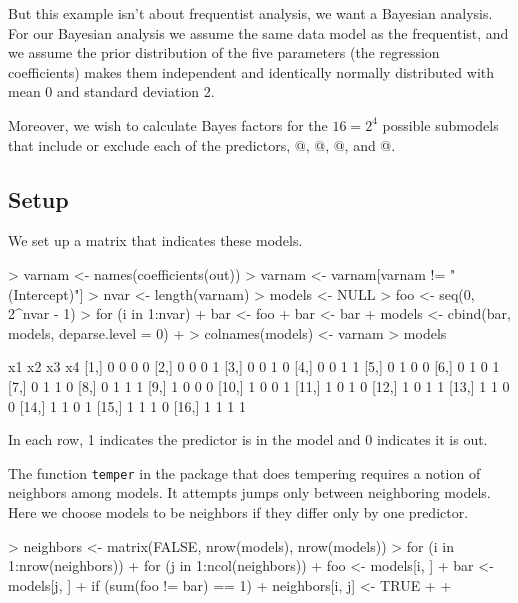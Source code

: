 \documentclass[11pt]{article}
\begin{document}
But this example isn't about frequentist analysis, we want a Bayesian
analysis.  For our Bayesian analysis we assume the same data model as the
frequentist, and we assume the prior distribution of the five parameters
(the regression coefficients) makes them independent and identically
normally distributed with mean 0 and standard deviation 2.

Moreover, we wish to calculate Bayes factors for the $16 = 2^4$ possible
submodels that include or exclude each of the
predictors, @, @, @, and @.

\subsection{Setup}

We set up a matrix that indicates these models.
\begin{Schunk}
\begin{Sinput}
> varnam <- names(coefficients(out))
> varnam <- varnam[varnam != "(Intercept)"]
> nvar <- length(varnam)
> models <- NULL
> foo <- seq(0, 2^nvar - 1)
> for (i in 1:nvar) {
+     bar <- foo%/%2^(i - 1)
+     bar <- bar%%2
+     models <- cbind(bar, models, deparse.level = 0)
+ }
> colnames(models) <- varnam
> models
\end{Sinput}
\begin{Soutput}
      x1 x2 x3 x4
 [1,]  0  0  0  0
 [2,]  0  0  0  1
 [3,]  0  0  1  0
 [4,]  0  0  1  1
 [5,]  0  1  0  0
 [6,]  0  1  0  1
 [7,]  0  1  1  0
 [8,]  0  1  1  1
 [9,]  1  0  0  0
[10,]  1  0  0  1
[11,]  1  0  1  0
[12,]  1  0  1  1
[13,]  1  1  0  0
[14,]  1  1  0  1
[15,]  1  1  1  0
[16,]  1  1  1  1
\end{Soutput}
\end{Schunk}
In each row, 1 indicates the predictor is in the model and 0 indicates it is
out.

The function \texttt{temper} in the  package that does tempering
requires a notion of neighbors among models.  It attempts jumps only between
neighboring models.  Here we choose models to be neighbors if they differ
only by one predictor.
\begin{Schunk}
\begin{Sinput}
> neighbors <- matrix(FALSE, nrow(models), nrow(models))
> for (i in 1:nrow(neighbors)) {
+     for (j in 1:ncol(neighbors)) {
+         foo <- models[i, ]
+         bar <- models[j, ]
+         if (sum(foo != bar) == 1) 
+             neighbors[i, j] <- TRUE
+     }
+ }
\end{Sinput}
\end{Schunk}
\end{document}
